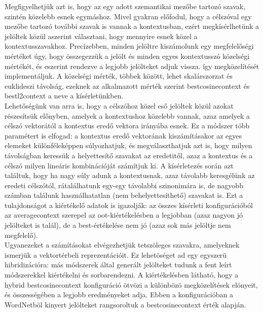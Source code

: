 \documentclass{llncs}
\begin{document}
Megfigyelhetj\"{u}k azt is, hogy az egy adott szemantikai mez\H{o}be tartoz\'{o} szavak, szint\'{e}n k\"{o}zelebb esnek egym\'{a}shoz. Mivel gyakran el\H{o}fodul, hogy a c\'{e}lsz\'{o}val egy mez\H{o}be tartoz\'{o} tov\'{a}bbi szavak is vannak a kontextusban, ez\'{e}rt megk\'{i}s\'{e}rlhet\"{u}nk a jel\"{o}ltek k\"{o}z\"{u}l aszerint v\'{a}lasztani, hogy mennyire esnek k\"{o}zel a kontextusszavakhoz. Prec\'{i}zebben, minden jel\"{o}ltre kisz\'{a}molunk egy megfelel\H{o}s\'{e}gi m\'{e}rt\'{e}ket \'{u}gy, hogy \"{o}sszegezz\"{u}k a jel\"{o}lt \'{e}s minden egyes kontextussz\'{o} k\"{o}zels\'{e}gi m\'{e}rt\'{e}k\'{e}t, \'{e}s eszerint rendezve a legjobb jel\"{o}lteket adjuk vissza. \'{i}gy \cite{zweig12} megk\"{o}zel\'{i}t\'{e}s\'{e}t implement\'{a}ljuk. A k\"{o}zels\'{e}gi m\'{e}rt\'{e}k, t\"{o}bbek k\"{o}z\"{o}tt, lehet skal\'{a}rszorzat \'{e}s euklideszi t\'{a}vols\'{a}g, ezeknek az alkalmazott m\'{e}rt\'{e}k szerint bestcosinecontext \'{e}s bestl2context a neve a k\'{i}s\'{e}rlet\"{u}nkben. \\

Lehet\H{o}s\'{e}g\"{u}nk van arra is, hogy a c\'{e}lsz\'{o}hoz k\"{o}zel es\H{o} jel\"{o}ltek k\"{o}z\"{u}l azokat r\'{e}szes\'{i}ts\"{u}k el\H{o}nyben, amelyek a kontextushoz k\"{o}zelebb vannak, azaz amelyek a c\'{e}lsz\'{o} vektor\'{a}t\'{o}l a kontextus ered\H{o} vektora ir\'{a}ny\'{a}ba esnek. Ez a m\'{o}dszer t\"{o}bb param\'{e}tert is elfogad: a kontextus ered\H{o} vektor\'{a}nak kisz\'{a}m\'{i}t\'{a}sakor az egyes elemeket k\"{u}l\"{o}nf\'{e}lek\'{e}ppen s\'{u}lyozhatjuk, \'{e}s megv\'{a}laszthatjuk azt is, hogy milyen t\'{a}vols\'{a}gban keress\"{u}k a helyettes\'{i}t\H{o} szavakat az eredetit\H{o}l, azaz a kontextus \'{e}s a c\'{e}lsz\'{o} milyen line\'{a}ris kombin\'{a}ci\'{o}j\'{a}t sz\'{a}m\'{i}tjuk ki. A k\'{i}s\'{e}rletez\'{e}s sor\'{a}n azt tal\'{a}ltuk, hogy ha nagy s\'{u}ly adunk a kontextusnak, azaz t\'{a}volabb keresg\'{e}l\"{u}nk az eredeti c\'{e}lsz\'{o}t\'{o}l, r\'{a}tal\'{a}lhatunk egy-egy t\'{a}volabbi szinonim\'{a}ra is, de nagyobb sz\'{a}mban tal\'{a}lunk haszn\'{a}lhatatlan (nem behelyettes\'{i}thet\H{o}) szavakat is. Ezt a tulajdons\'{a}got a ki\'{e}rt\'{e}kel\H{o} adatok is igazolj\'{a}k: az \"{o}sszes k\'{i}s\'{e}rleti konfigur\'{a}ci\'{o}b\'{o}l az averagecontext szerepel az oot-ki\'{e}rt\'{e}kel\'{e}sben a legjobban (azaz nagyon j\'{o} jel\"{o}lteket is tal\'{a}l), de a best-\'{e}rt\'{e}kel\'{e}se nem j\'{o} (azaz sok m\'{a}s jel\"{o}ltje nem megfelel\H{o}).\\

Ugyanezeket a sz\'{a}m\'{i}t\'{a}sokat elv\'{e}gezhetj\"{u}k tetsz\"{o}leges szavakra, amelyeknek ismerj\"{u}k a vektort\'{e}rbeli reprezent\'{a}ci\'{o}it. Ez lehet\"{o}s\'{e}get ad egy egyszer\"{u} hibridiz\'{a}ci\'{o}ra: m\'{a}s m\'{o}dszerek \'{a}ltal gener\'{a}lt jel\"{o}lteket tudunk a fent le\'{i}rt m\'{o}dszerekkel ki\'{e}rt\'{e}kelni \'{e}s sorbarendezni. A ki\'{e}rt\'{e}kel\'{e}sben l\'{a}that\'{o}, hogy a hybrid bestcosinecontext konfigur\'{a}ci\'{o} \"{o}tv\"{o}zi a k\"{u}l\"{o}nb\"{o}z\"{o} megk\"{o}zel\'{i}t\'{e}sek el\"{o}nyeit, \'{e}s \"{o}sszess\'{e}g\'{e}ben a legjobb eredm\'{e}nyeket adja. Ebben a konfigur\'{a}ci\'{o}ban a WordNetb\"{o}l kinyert jel\"{o}lteket rangsoroltuk a bestcosinecontext \'{e}rt\'{e}k alapj\'{a}n.
\end{document}
